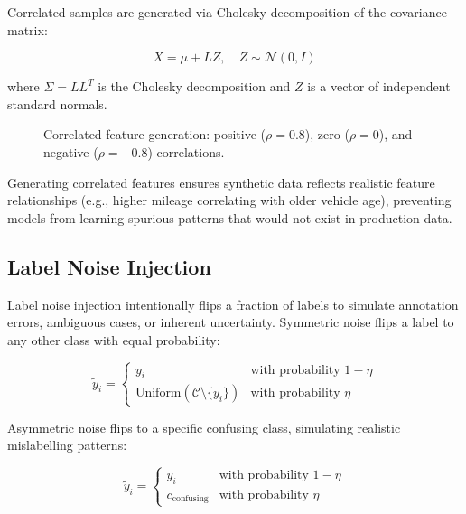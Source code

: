 \documentclass[10pt,a4paper]{article}
\begin{document}
Correlated samples are generated via Cholesky decomposition of the covariance matrix:

\begin{equation}
X = \mu + L Z, \quad Z \sim \mathcal{N}(0, I)
\label{eq:cholesky}
\end{equation}

where $\Sigma = LL^T$ is the Cholesky decomposition and $Z$ is a vector of independent standard normals.

\begin{figure}[H]
    \centering
    \caption{Correlated feature generation: positive ($\rho = 0.8$), zero ($\rho = 0$), and negative ($\rho = -0.8$) correlations.}
    \label{fig:correlated-features}
\end{figure}

Generating correlated features ensures synthetic data reflects realistic feature relationships (e.g., higher mileage correlating with older vehicle age), preventing models from learning spurious patterns that would not exist in production data.

\subsection{Label Noise Injection}
\label{sec:label-noise}

Label noise injection intentionally flips a fraction of labels to simulate annotation errors, ambiguous cases, or inherent uncertainty. Symmetric noise flips a label to any other class with equal probability:

\begin{equation}
\tilde{y}_i = \begin{cases} y_i & \text{with probability } 1 - \eta \\ \text{Uniform}(\mathcal{C} \setminus \{y_i\}) & \text{with probability } \eta \end{cases}
\label{eq:symmetric-noise}
\end{equation}

Asymmetric noise flips to a specific confusing class, simulating realistic mislabelling patterns:

\begin{equation}
\tilde{y}_i = \begin{cases} y_i & \text{with probability } 1 - \eta \\ c_{\text{confusing}} & \text{with probability } \eta \end{cases}
\label{eq:asymmetric-noise}
\end{equation}
\end{document}
